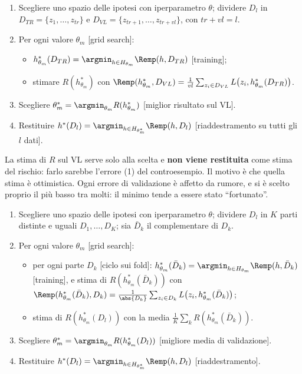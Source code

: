 \begin{algoritmo}
\begin{enumerate}
  \item Scegliere uno spazio delle ipotesi con iperparametro $\theta$; dividere $D_l$ in
        $D_{TR} = \{z_1,\dots,z_{tr}\}$ e $D_{VL} = \{z_{tr+1},\dots,z_{tr+vl}\}$, con $tr+vl=l$.
  \item Per ogni valore $\theta_m$ [grid search]:
        \begin{itemize}
          \item $h^*_{\theta_m}(D_{TR}) = \argmin_{h\in H_{\theta_m}}\Remp(h,D_{TR})$ [training];
          \item stimare $R(h^*_{\theta_m})$ con
                $\Remp(h^*_{\theta_m},D_{VL}) = \frac{1}{vl}\sum_{z_i\in D_{VL}}L\big(z_i,h^*_{\theta_m}(D_{TR})\big)$.
        \end{itemize}
  \item Scegliere $\theta^*_m = \argmin_{\theta_m}R(h^*_{\theta_m})$ [miglior risultato sul VL].
  \item Restituire $h^*(D_l) = \argmin_{h\in H_{\theta^*_m}}\Remp(h,D_l)$ [riaddestramento su tutti gli $l$ dati].
\end{enumerate}
\end{algoritmo}

La stima di $R$ sul VL serve solo alla scelta e \textbf{non viene restituita} come stima del rischio: farlo
sarebbe l'errore (1) del controesempio. Il motivo è che quella stima è ottimistica. Ogni errore di validazione è
affetto da rumore, e si è scelto proprio il più basso tra molti: il minimo tende a essere stato ``fortunato''.

\begin{algoritmo}
\begin{enumerate}
  \item Scegliere uno spazio delle ipotesi con iperparametro $\theta$; dividere $D_l$ in $K$ parti distinte e
        uguali $D_1,\dots,D_K$; sia $\bar D_k$ il complementare di $D_k$.
  \item Per ogni valore $\theta_m$ [grid search]:
        \begin{itemize}
          \item per ogni parte $D_k$ [ciclo sui fold]: $h^*_{\theta_m}(\bar D_k) = \argmin_{h\in H_{\theta_m}}\Remp(h,\bar D_k)$
                [training], e stima di $R(h^*_{\theta_m}(\bar D_k))$ con
                $\Remp(h^*_{\theta_m}(\bar D_k),D_k) = \frac{1}{\abs{D_k}}\sum_{z_i\in D_k}L\big(z_i,h^*_{\theta_m}(\bar D_k)\big)$;
          \item stima di $R(h^*_{\theta_m}(D_l))$ con la media $\frac1K\sum_kR(h^*_{\theta_m}(\bar D_k))$.
        \end{itemize}
  \item Scegliere $\theta^*_m = \argmin_{\theta_m}R(h^*_{\theta_m}(D_l))$ [migliore media di validazione].
  \item Restituire $h^*(D_l) = \argmin_{h\in H_{\theta^*_m}}\Remp(h,D_l)$ [riaddestramento].
\end{enumerate}
\end{algoritmo}

